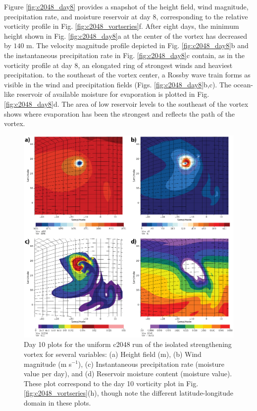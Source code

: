    Figure \ref{fig:c2048_day8} provides a snapshot of the height field, wind magnitude, precipitation rate, and moisture reservoir at day 8, 
   corresponding to the relative vorticity profile in Fig. \ref{fig:c2048_vortseries}f.
   After eight days, the minimum height shown in Fig. \ref{fig:c2048_day8}a
   at the center of the vortex has decreased by $140$ m. The velocity magnitude
   profile depicted in Fig. \ref{fig:c2048_day8}b and the instantaneous precipitation rate 
   in Fig. \ref{fig:c2048_day8}c contain, as in the vorticity profile at day 8, an
   elongated ring of strongest winds and heaviest precipitation. to the southeast of the
   vortex center, a Rossby wave train forms as visible in the wind and precipitation
   fields (Figs. \ref{fig:c2048_day8}b,c). The ocean-like reservoir of available moisture 
   for evaporation is plotted in Fig. \ref{fig:c2048_day8}d. The area of low reservoir levels
   to the southeast of the vortex shows where evaporation has been the strongest and
   reflects the path of the vortex. 
      
\begin{figure}
    \centerline{%
    \noindent
    \includegraphics[width=\textwidth]{Chap2/c2048_day10_plots-01.eps}}
   \caption{Day 10 plots for the uniform c2048 run of the isolated strengthening vortex for several variables: 
   (a) Height field (m), (b) Wind magnitude (m s$^{-1}$), (c) Instantaneous precipitation rate (moisture value per day), 
   and (d) Reservoir moisture content (moisture value).
   These plot correspond to the day 10 vorticity plot in Fig. \ref{fig:c2048_vortseries}(h), though
    note the different latitude-longitude domain in these plots. }%
    \label{fig:c2048_day10}
\end{figure}

